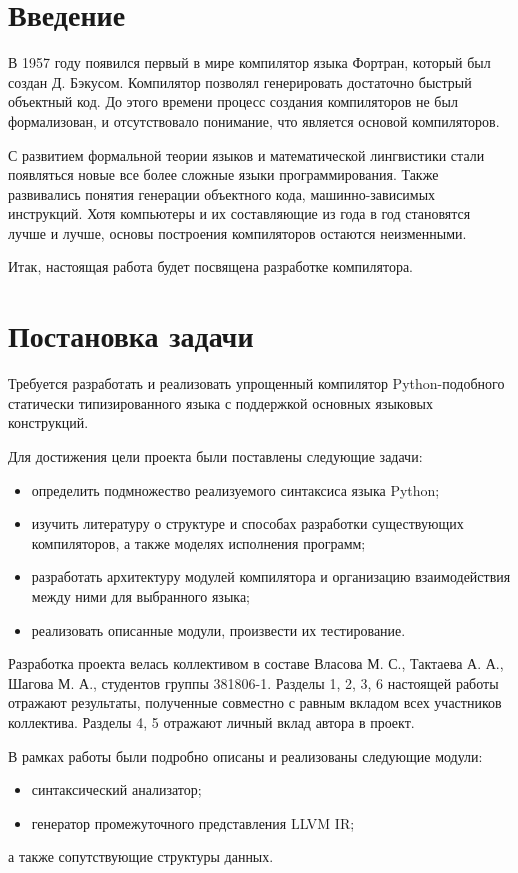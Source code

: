 \newpage
\section*{Введение}

В 1957 году появился первый в мире компилятор языка Фортран, который был создан Д. Бэкусом.
Компилятор позволял генерировать достаточно быстрый объектный код.
До этого времени процесс создания компиляторов не был формализован, и отсутствовало понимание, что является основой компиляторов.

С развитием формальной теории языков и математической лингвистики стали появляться новые все более сложные языки программирования.
Также развивались понятия генерации объектного кода, машинно-зависимых инструкций.
Хотя компьютеры и их составляющие из года в год становятся лучше и лучше, основы построения компиляторов остаются неизменными.

Итак, настоящая работа будет посвящена разработке компилятора.

\newpage
\section*{Постановка задачи}

Требуется разработать и реализовать упрощенный компилятор Python-подобного статически типизированного языка с поддержкой основных языковых конструкций.

Для достижения цели проекта были поставлены следующие задачи:

\begin{itemize}
    \item определить подмножество реализуемого синтаксиса языка Python;
    \item изучить литературу о структуре и способах разработки существующих компиляторов, а также моделях исполнения программ;
    \item разработать архитектуру модулей компилятора и организацию взаимодействия между ними для выбранного языка;
    \item реализовать описанные модули, произвести их тестирование.
\end{itemize}

Разработка проекта велась коллективом в составе Власова М. С., Тактаева А. А., Шагова М. А., студентов группы 381806-1.
Разделы 1, 2, 3, 6 настоящей работы отражают результаты, полученные совместно с равным вкладом всех участников коллектива.
Разделы 4, 5 отражают личный вклад автора в проект.

В рамках работы были подробно описаны и реализованы следующие модули:

\begin{itemize}
    \item синтаксический анализатор;
    \item генератор промежуточного представления LLVM IR;
\end{itemize}

а также сопутствующие структуры данных.
